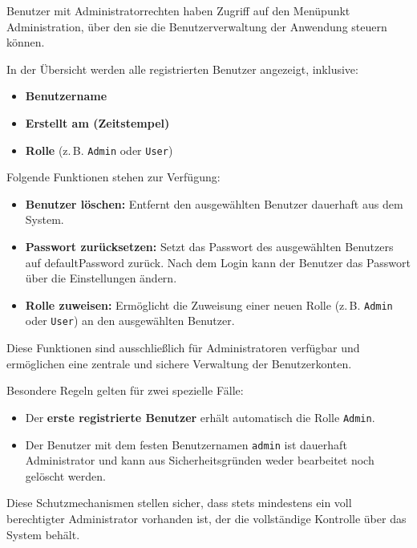 

Benutzer mit Administratorrechten haben Zugriff auf den Menüpunkt \glqq Administration\grqq{}, über den sie die Benutzerverwaltung der Anwendung steuern können. 

In der Übersicht werden alle registrierten Benutzer angezeigt, inklusive:

\begin{itemize}
    \item \textbf{Benutzername}
    \item \textbf{Erstellt am (Zeitstempel)}
    \item \textbf{Rolle} (z.\,B. \texttt{Admin} oder \texttt{User})
\end{itemize}

\vspace{0.5em}
Folgende Funktionen stehen zur Verfügung:

\begin{itemize}
    \item \textbf{Benutzer löschen:} Entfernt den ausgewählten Benutzer dauerhaft aus dem System.
    \item \textbf{Passwort zurücksetzen:} Setzt das Passwort des ausgewählten Benutzers auf \glqq defaultPassword\grqq{} zurück. Nach dem Login kann der Benutzer das Passwort über die Einstellungen ändern.
    \item \textbf{Rolle zuweisen:} Ermöglicht die Zuweisung einer neuen Rolle (z.\,B. \texttt{Admin} oder \texttt{User}) an den ausgewählten Benutzer.
\end{itemize}

Diese Funktionen sind ausschließlich für Administratoren verfügbar und ermöglichen eine zentrale und sichere Verwaltung der Benutzerkonten.

Besondere Regeln gelten für zwei spezielle Fälle:

\begin{itemize}
    \item Der \textbf{erste registrierte Benutzer} erhält automatisch die Rolle \texttt{Admin}.
    \item Der Benutzer mit dem festen Benutzernamen \texttt{admin} ist dauerhaft Administrator und kann aus Sicherheitsgründen weder bearbeitet noch gelöscht werden.
\end{itemize}

Diese Schutzmechanismen stellen sicher, dass stets mindestens ein voll berechtigter Administrator vorhanden ist, der die vollständige Kontrolle über das System behält.

